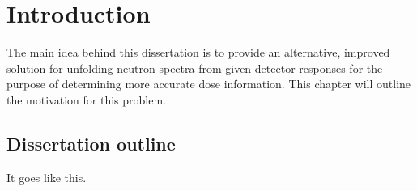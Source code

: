 \chapter{Introduction}\label{chap_intro}

The main idea behind this dissertation is to provide an alternative, improved solution for unfolding neutron spectra from given detector responses for the purpose of determining more accurate dose information. This chapter will outline the motivation for this problem.



\section{Dissertation outline}\label{sec_dissertation_outline}
It goes like this.